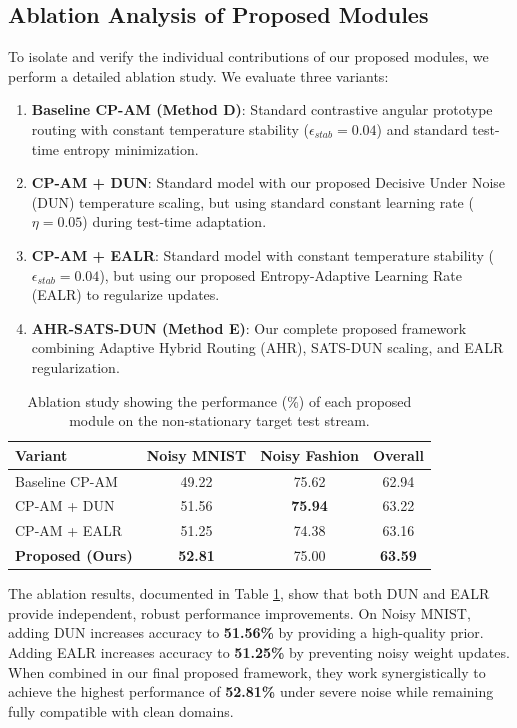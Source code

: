 \documentclass{article}
\theoremstyle{plain}
\theoremstyle{definition}
\theoremstyle{remark}
\begin{document}
\subsection{Ablation Analysis of Proposed Modules}
To isolate and verify the individual contributions of our proposed modules, we perform a detailed ablation study. We evaluate three variants:
\begin{enumerate}
    \item \textbf{Baseline CP-AM (Method D)}: Standard contrastive angular prototype routing with constant temperature stability ($\epsilon_{stab} = 0.04$) and standard test-time entropy minimization.
    \item \textbf{CP-AM + DUN}: Standard model with our proposed Decisive Under Noise (DUN) temperature scaling, but using standard constant learning rate ($\eta = 0.05$) during test-time adaptation.
    \item \textbf{CP-AM + EALR}: Standard model with constant temperature stability ($\epsilon_{stab} = 0.04$), but using our proposed Entropy-Adaptive Learning Rate (EALR) to regularize updates.
    \item \textbf{AHR-SATS-DUN (Method E)}: Our complete proposed framework combining Adaptive Hybrid Routing (AHR), SATS-DUN scaling, and EALR regularization.
\end{enumerate}

\begin{table}[h]
\caption{Ablation study showing the performance (\%) of each proposed module on the non-stationary target test stream.}
\label{tab:ablation}
\centering
\begin{footnotesize}
\begin{sc}
\setlength{\tabcolsep}{1.0pt}
\begin{tabular}{lccc}
\toprule
Variant & Noisy MNIST & Noisy Fashion & Overall \\
\midrule
Baseline CP-AM  & 49.22 & 75.62 & 62.94 \\
CP-AM + DUN     & 51.56 & \textbf{75.94} & 63.22 \\
CP-AM + EALR    & 51.25 & 74.38 & 63.16 \\
\midrule
\textbf{Proposed (Ours)} & \textbf{52.81} & 75.00 & \textbf{63.59} \\
\bottomrule
\end{tabular}
\end{sc}
\end{footnotesize}
\end{table}

The ablation results, documented in Table \ref{tab:ablation}, show that both DUN and EALR provide independent, robust performance improvements. On Noisy MNIST, adding DUN increases accuracy to \textbf{51.56\%} by providing a high-quality prior. Adding EALR increases accuracy to \textbf{51.25\%} by preventing noisy weight updates. When combined in our final proposed framework, they work synergistically to achieve the highest performance of \textbf{52.81\%} under severe noise while remaining fully compatible with clean domains.
\end{document}
